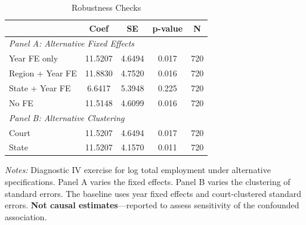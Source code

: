\begin{table}[htbp]
\centering
\caption{Robustness Checks}
\label{tab:robustness}
\begin{tabular}{lcccc}
\toprule
 & Coef & SE & p-value & N \\
\midrule
\multicolumn{5}{l}{\textit{Panel A: Alternative Fixed Effects}} \\
Year FE only & 11.5207 & 4.6494 & 0.017 & 720 \\
Region + Year FE & 11.8830 & 4.7520 & 0.016 & 720 \\
State + Year FE & 6.6417 & 5.3948 & 0.225 & 720 \\
No FE & 11.5148 & 4.6099 & 0.016 & 720 \\
\midrule
\multicolumn{5}{l}{\textit{Panel B: Alternative Clustering}} \\
Court & 11.5207 & 4.6494 & 0.017 & 720 \\
State & 11.5207 & 4.1570 & 0.011 & 720 \\
\bottomrule
\end{tabular}
\begin{minipage}{0.85\textwidth}
\vspace{0.5em}
\footnotesize \textit{Notes:} Diagnostic IV exercise for log total employment
under alternative specifications. Panel A varies the fixed effects.
Panel B varies the clustering of standard errors.
The baseline uses year fixed effects and court-clustered standard errors.
\textbf{Not causal estimates}---reported to assess sensitivity of the confounded association.
\end{minipage}
\end{table}
